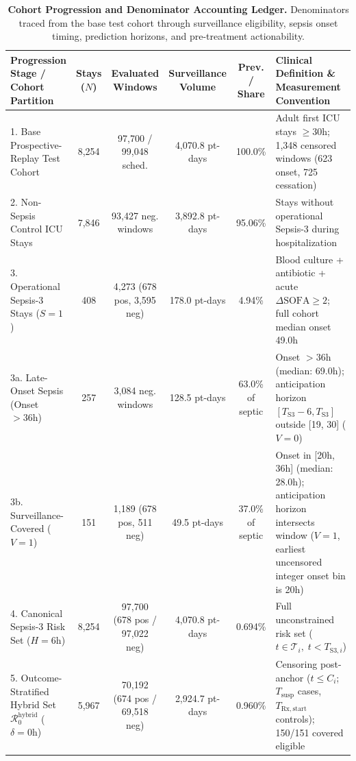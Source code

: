 \documentclass[12pt,a4paper]{article}
\begin{document}
\clearpage
\begin{table}[p]
\begin{singlespace}
\centering
\caption{\textbf{Cohort Progression and Denominator Accounting Ledger.} Denominators traced from the base test cohort through surveillance eligibility, sepsis onset timing, prediction horizons, and pre-treatment actionability.}
\label{tab:table1}
\vspace{0.4em}
\fontsize{8.0pt}{10.2pt}\selectfont
\setlength{\tabcolsep}{2.5pt}
\begin{tabularx}{\textwidth}{@{}p{3.8cm} c c c c X@{}}
\toprule
\textbf{Progression Stage / Cohort Partition} & \textbf{Stays ($N$)} & \textbf{Evaluated Windows} & \textbf{Surveillance Volume} & \textbf{Prev. / Share} & \textbf{Clinical Definition \& Measurement Convention} \\
\midrule
1. Base Prospective-Replay Test Cohort & 8,254 & 97,700 / 99,048 sched. & 4,070.8 pt-days & 100.0\% & Adult first ICU stays $\ge 30\text{h}$; 1,348 censored windows (623 onset, 725 cessation) \\
2. Non-Sepsis Control ICU Stays & 7,846 & 93,427 neg. windows & 3,892.8 pt-days & 95.06\% & Stays without operational Sepsis-3 during hospitalization \\
3. Operational Sepsis-3 Stays ($S=1$) & 408 & 4,273 (678 pos, 3,595 neg) & 178.0 pt-days & 4.94\% & Blood culture + antibiotic + acute $\Delta\text{SOFA}\ge 2$; full cohort median onset 49.0h \\
\quad 3a. Late-Onset Sepsis (Onset $>36\text{h}$) & 257 & 3,084 neg. windows & 128.5 pt-days & 63.0\% of septic & Onset $>36\text{h}$ (median: 69.0h); anticipation horizon $[T_{\text{S3}}-6, T_{\text{S3}}]$ outside [19, 30] ($V=0$) \\
\quad 3b. Surveillance-Covered ($V=1$) & 151 & 1,189 (678 pos, 511 neg) & 49.5 pt-days & 37.0\% of septic & Onset in [20h, 36h] (median: 28.0h); anticipation horizon intersects window ($V=1$, earliest uncensored integer onset bin is 20h) \\
4. Canonical Sepsis-3 Risk Set ($H=6\text{h}$) & 8,254 & 97,700 (678 pos / 97,022 neg) & 4,070.8 pt-days & 0.694\% & Full unconstrained risk set ($t \in \mathcal{T}_i, \; t < T_{\text{S3}, i}$) \\
5. Outcome-Stratified Hybrid Set $\mathcal{R}_0^{\mathrm{hybrid}}$ ($\delta=0\text{h}$) & 5,967 & 70,192 (674 pos / 69,518 neg) & 2,924.7 pt-days & 0.960\% & Censoring post-anchor ($t \le C_i$; $T_{\mathrm{susp}}$ cases, $T_{\mathrm{Rx,start}}$ controls); 150/151 covered eligible \\

\end{tabularx}
\end{singlespace}
\end{table}
\end{document}
